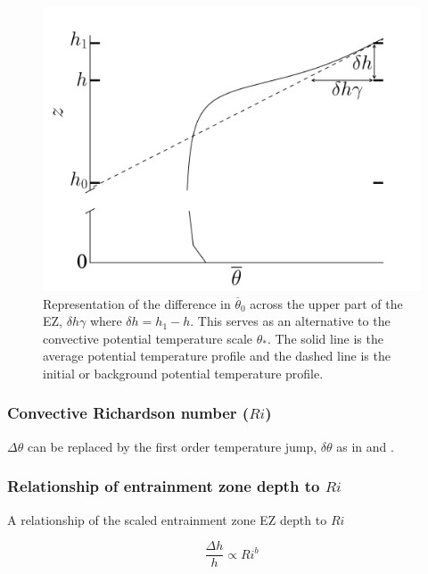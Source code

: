 \documentclass[referee]{svjour3}
\begin{document}
\begin{figure}[htbp]
    \centering
    \includegraphics[scale=.32]{figures/deltah_gamma.pdf}
    \caption[Alternative Potential Temperature Scale for the EZ]{Representation of the difference in $\overline{\theta}_{0}$ across the upper part of the EZ, $\delta h \gamma$ where $\delta h = h_{1} - h$. This serves as an alternative to the convective potential temperature scale $\theta_{*}$.  The solid line is the average potential temperature profile and the dashed line is the initial or background potential temperature profile.}
    \label{fig:deltahgamma}   %
\end{figure}

\subsubsection{Convective Richardson number ($Ri$)}
\label{subsubsec:}


$\Delta \theta$ can be replaced by the first order temperature jump, $\delta \theta$ as in \cite{FedConzMir04} and \cite{GarciaMellado}. 

\subsubsection{Relationship of entrainment zone depth to $Ri$}

A relationship of the scaled entrainment zone EZ depth to $Ri$

\begin{equation}\label{eq:dhvsri}
\frac{\Delta h}{h} \propto Ri ^{b}
\end{equation}
\end{document}
